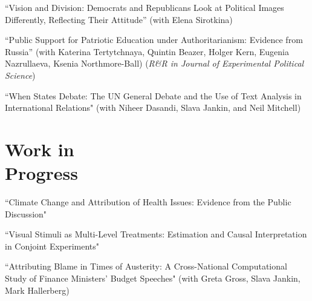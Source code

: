 \documentclass[margin,line,10.95pt]{res}
\begin{document}
\begin{resume}
\vspace*{-2.5mm}
``Vision and Division: Democrats and Republicans Look at Political Images Differently, Reflecting Their Attitude'' (with Elena Sirotkina)

\vspace*{-2.5mm}
``Public Support for Patriotic Education under Authoritarianism: Evidence from Russia'' (with Katerina Tertytchnaya, Quintin Beazer, Holger Kern, Eugenia Nazrullaeva, Ksenia Northmore-Ball) (\textit{R\&R in Journal of Experimental Political Science})

\vspace*{-2.5mm}
``When States Debate: The UN General Debate and the Use of Text Analysis in International Relations" (with Niheer Dasandi, Slava Jankin, and Neil Mitchell)

\section{\sc Work in \\ Progress}


``Climate Change and Attribution of Health Issues: Evidence from the Public Discussion" 

\vspace*{-3.5mm}
``Visual Stimuli as Multi-Level Treatments: Estimation and Causal Interpretation in Conjoint Experiments"

\vspace*{-3.5mm}
``Attributing Blame in Times of Austerity: A Cross-National Computational Study of Finance Ministers' Budget Speeches" (with Greta Gross, Slava Jankin, Mark Hallerberg)





\end{resume}
\end{document}
